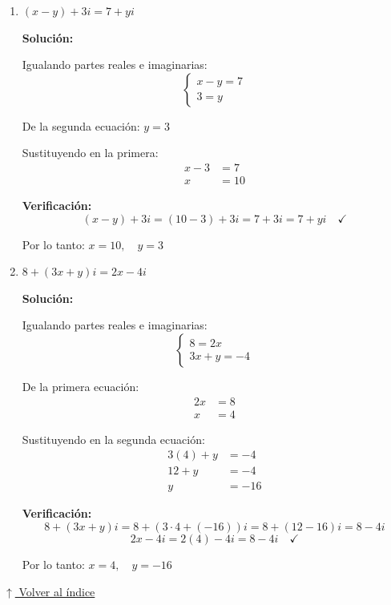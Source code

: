 \documentclass[12pt]{article}
\newcommand{\solucion}{%
    \vspace{0.8em}%
    \textbf{Solución:}%
}
\newcommand{\volverindice}{%
    \vspace{1em}%
    \begin{flushright}%
        \hyperlink{indice}{\small $\uparrow$ Volver al índice}%
    \end{flushright}%
}
\begin{document}
\begin{enumerate}[label=\alph*.-]
    \newpage
    \item $(x - y) + 3i = 7 + yi$

    \solucion

    Igualando partes reales e imaginarias:
    \[
    \begin{cases}
    x - y = 7 \\
    3 = y
    \end{cases}
    \]

    De la segunda ecuación: $y = 3$

    Sustituyendo en la primera:
    \begin{align*}
    x - 3 &= 7 \\[0.3em]
    x &= 10
    \end{align*}

    \textbf{Verificación:}
    \[
    (x - y) + 3i = (10 - 3) + 3i = 7 + 3i = 7 + yi \quad \checkmark
    \]

    Por lo tanto: $\boxed{x = 10, \quad y = 3}$

    \item $8 + (3x + y)i = 2x - 4i$

    \solucion

    Igualando partes reales e imaginarias:
    \[
    \begin{cases}
    8 = 2x \\
    3x + y = -4
    \end{cases}
    \]

    De la primera ecuación:
    \begin{align*}
    2x &= 8 \\[0.3em]
    x &= 4
    \end{align*}

    Sustituyendo en la segunda ecuación:
    \begin{align*}
    3(4) + y &= -4 \\[0.3em]
    12 + y &= -4 \\[0.3em]
    y &= -16
    \end{align*}

    \textbf{Verificación:}
    \[
    8 + (3x + y)i = 8 + (3 \cdot 4 + (-16))i = 8 + (12 - 16)i = 8 - 4i
    \]
    \[
    2x - 4i = 2(4) - 4i = 8 - 4i \quad \checkmark
    \]

    Por lo tanto: $\boxed{x = 4, \quad y = -16}$
\end{enumerate}

\volverindice
\newpage
\end{document}
